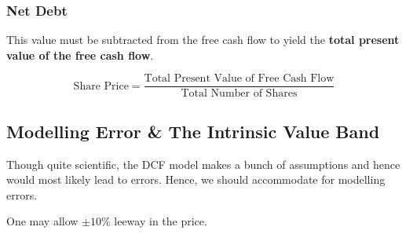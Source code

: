 \subsubsection{Net Debt}


This value must be subtracted from the free cash flow to yield the \textbf{total present value of the free cash flow}.

\begin{displaymath}
  \textrm{Share Price} = \frac{\textrm{Total Present Value of Free Cash Flow}}{\textrm{Total Number of Shares}}
\end{displaymath}

\subsection{Modelling Error \& The Intrinsic Value Band}
Though quite scientific, the DCF model makes a bunch of assumptions and hence would most likely lead to errors. Hence, we should accommodate for modelling errors.

One may allow $\pm 10\%$ leeway in the price.
